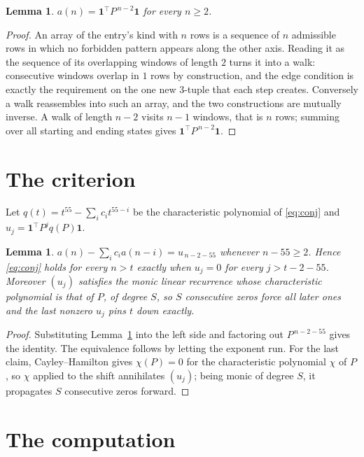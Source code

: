 \documentclass[11pt,a4paper]{article}
\theoremstyle{plain}
\newtheorem{lemma}[theorem]{Lemma}
\theoremstyle{definition}
\begin{document}
\begin{lemma}\label{lem:walk}
$a(n)=\mathbf{1}^{\!\top}P^{\,n-2}\mathbf{1}$ for every $n\ge2$.
\end{lemma}

\begin{proof}
An array of the entry's kind with $n$ rows is a sequence of $n$ admissible rows in
which no forbidden pattern appears along the other axis. Reading it as the sequence of its
overlapping windows of length $2$ turns it into a walk: consecutive windows overlap in
$1$ rows by construction, and the edge condition is exactly the requirement on the one
new $3$-tuple that each step creates. Conversely a walk reassembles into such an array,
and the two constructions are mutually inverse. A walk of length $n-2$ visits $n-1$
windows, that is $n$ rows; summing over all starting and ending states gives
$\mathbf{1}^{\!\top}P^{\,n-2}\mathbf{1}$.
\end{proof}

\section{The criterion}

Let $q(t)=t^{55}-\sum_i c_i t^{55-i}$ be the characteristic polynomial of
\eqref{eq:conj} and $u_j=\mathbf{1}^{\!\top}P^{j}q(P)\mathbf{1}$.

\begin{lemma}\label{lem:crit}
$a(n)-\sum_i c_i a(n-i)=u_{\,n-2-55}$ whenever $n-55\ge2$. Hence
\eqref{eq:conj} holds for every $n>t$ exactly when $u_j=0$ for every
$j>t-2-55$. Moreover $(u_j)$ satisfies the monic linear recurrence whose
characteristic polynomial is that of $P$, of degree $S$, so $S$ consecutive zeros force all
later ones and the last nonzero $u_j$ pins $t$ down exactly.
\end{lemma}

\begin{proof}
Substituting Lemma~\ref{lem:walk} into the left side and factoring out
$P^{\,n-2-55}$ gives the identity. The equivalence follows by letting the exponent
run. For the last claim, Cayley--Hamilton gives $\chi(P)=0$ for the characteristic
polynomial $\chi$ of $P$, so $\chi$ applied to the shift annihilates $(u_j)$; being monic of
degree $S$, it propagates $S$ consecutive zeros forward.
\end{proof}

\section{The computation}
\end{document}
